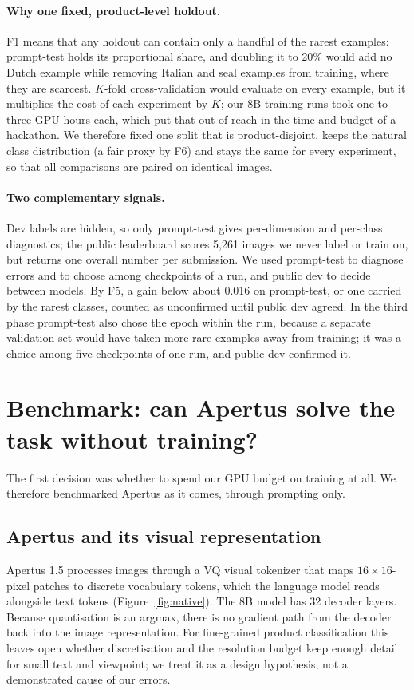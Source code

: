 \documentclass[11pt]{article}
\begin{document}
\paragraph{Why one fixed, product-level holdout.} F1 means that any holdout can contain only a handful of the rarest examples: prompt-test holds its proportional share, and doubling it to 20\% would add no Dutch example while removing Italian and seal examples from training, where they are scarcest. $K$-fold cross-validation would evaluate on every example, but it multiplies the cost of each experiment by $K$; our 8B training runs took one to three GPU-hours each, which put that out of reach in the time and budget of a hackathon. We therefore fixed one split that is product-disjoint, keeps the natural class distribution (a fair proxy by F6) and stays the same for every experiment, so that all comparisons are paired on identical images.

\paragraph{Two complementary signals.} Dev labels are hidden, so only prompt-test gives per-dimension and per-class diagnostics; the public leaderboard scores 5,261 images we never label or train on, but returns one overall number per submission. We used prompt-test to diagnose errors and to choose among checkpoints of a run, and public dev to decide between models. By F5, a gain below about 0.016 on prompt-test, or one carried by the rarest classes, counted as unconfirmed until public dev agreed. In the third phase prompt-test also chose the epoch within the run, because a separate validation set would have taken more rare examples away from training; it was a choice among five checkpoints of one run, and public dev confirmed it.

\section{Benchmark: can Apertus solve the task without training?}
\label{sec:zero}
The first decision was whether to spend our GPU budget on training at all. We therefore benchmarked Apertus as it comes, through prompting only.

\subsection{Apertus and its visual representation}
\label{sec:apertus}
Apertus 1.5 processes images through a VQ visual tokenizer that maps $16\times16$-pixel patches to discrete vocabulary tokens, which the language model reads alongside text tokens \cite{apertus} (Figure~\ref{fig:native}). The 8B model has 32 decoder layers. Because quantisation is an argmax, there is no gradient path from the decoder back into the image representation. For fine-grained product classification this leaves open whether discretisation and the resolution budget keep enough detail for small text and viewpoint; we treat it as a design hypothesis, not a demonstrated cause of our errors.
\end{document}
